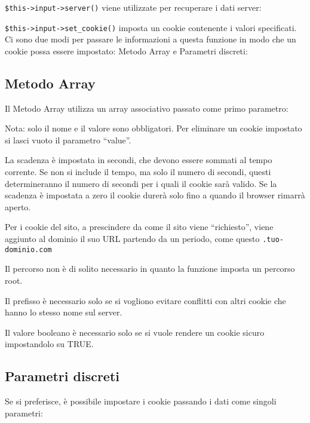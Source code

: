 \verb|$this->input->server()| viene utilizzate per recuperare i dati server:


\verb|$this->input->set_cookie()| imposta un cookie contenente i valori specificati. Ci sono due modi per passare le informazioni a questa funzione in modo che un cookie possa essere impostato: Metodo Array e Parametri discreti:

\subsection*{Metodo Array}
Il Metodo Array utilizza un array associativo passato come primo parametro:


Nota: solo il nome e il valore sono obbligatori. Per eliminare un cookie impostato si lasci vuoto il parametro ``value''.

La scadenza è impostata in secondi, che devono essere sommati al tempo corrente. Se non si include il tempo, ma solo il numero di secondi, questi determineranno il numero di secondi per i quali il cookie sarà valido. Se la scadenza è impostata a zero il cookie durerà solo fino a quando il browser rimarrà aperto.

Per i cookie del sito, a prescindere da come il sito viene ``richiesto'', viene aggiunto al dominio il suo \ac{URL} partendo da un periodo, come questo \verb|.tuo-dominio.com|

Il percorso non è di solito necessario in quanto la funzione imposta un percorso root.

Il prefisso è necessario solo se si vogliono evitare conflitti con altri cookie che hanno lo stesso nome sul server.

Il valore booleano  è necessario solo se si vuole rendere un cookie sicuro impostandolo su TRUE.

\subsection*{Parametri discreti}
Se si preferisce, è possibile impostare i cookie passando i dati come singoli parametri:

